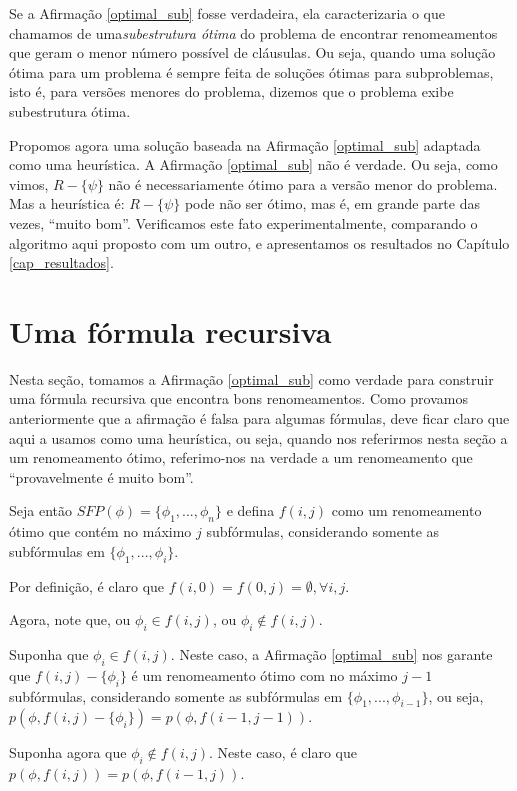 Se a Afirmação \ref{optimal_sub} fosse verdadeira, ela caracterizaria o que chamamos de uma\break \emph{subestrutura ótima} do problema de encontrar renomeamentos que geram o menor número possível de cláusulas. Ou seja, quando uma solução ótima para um problema é sempre feita de soluções ótimas para subproblemas, isto é, para versões menores do problema, dizemos que o problema exibe subestrutura ótima.

Propomos agora uma solução baseada na Afirmação \ref{optimal_sub} adaptada como uma heurística. A Afirmação \ref{optimal_sub} não é verdade. Ou seja, como vimos, $R - \{\psi \}$ não é necessariamente ótimo para a versão menor do problema. Mas a heurística é: $R - \{\psi \}$ pode não ser ótimo, mas é, em grande parte das vezes, ``muito bom''. Verificamos este fato experimentalmente, comparando o algoritmo aqui proposto com um outro, e apresentamos os resultados no Capítulo \ref{cap_resultados}.

\section{Uma fórmula recursiva}

\indent

Nesta seção, tomamos a Afirmação \ref{optimal_sub} como verdade para construir uma fórmula recursiva que encontra bons renomeamentos. Como provamos anteriormente que a afirmação é falsa para algumas fórmulas, deve ficar claro que aqui a usamos como uma heurística, ou seja, quando nos referirmos nesta seção a um renomeamento ótimo, referimo-nos na verdade a um renomeamento que ``provavelmente é muito bom''.

Seja então $SFP(\phi) = \{\phi_1,...,\phi_n \}$ e defina $f(i,j)$ como um renomeamento ótimo que contém no máximo $j$ subfórmulas, considerando somente as subfórmulas em $\{\phi_1,...,\phi_i \}$.

Por definição, é claro que $f(i,0) = f(0,j) = \emptyset, \forall i,j$.

Agora, note que, ou $\phi_i \in f(i,j)$, ou $\phi_i \notin f(i,j)$.

Suponha que $\phi_i \in f(i,j)$. Neste caso, a Afirmação \ref{optimal_sub} nos garante que $f(i,j) - \{\phi_i \}$ é um renomeamento ótimo com no máximo $j-1$ subfórmulas, considerando somente as subfórmulas em $\{\phi_1,...,\phi_{i-1} \}$, ou seja, $p(\phi,f(i,j) - \{\phi_i \}) = p(\phi,f(i-1,j-1))$.

Suponha agora que $\phi_i \notin f(i,j)$. Neste caso, é claro que $p(\phi,f(i,j)) = p(\phi,f(i-1,j))$.

